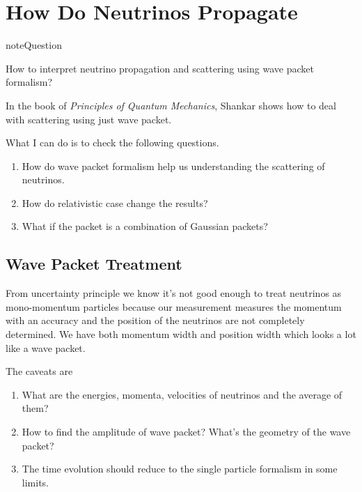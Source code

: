 \documentclass[letterpaper,12pt,english]{sphinxmanual}
\begin{document}
\chapter{How Do Neutrinos Propagate}
\label{propagation::doc}\label{propagation:how-do-neutrinos-propagate}
\begin{notice}{note}{Question}

How to interpret neutrino propagation and scattering using wave packet formalism?
\end{notice}

In the book of \emph{Principles of Quantum Mechanics}, Shankar shows how to deal with scattering using just wave packet.

What I can do is to check the following questions.
\begin{enumerate}
\item {} 
How do wave packet formalism help us understanding the scattering of neutrinos.

\item {} 
How do relativistic case change the results?

\item {} 
What if the packet is a combination of Gaussian packets?

\end{enumerate}


\section{Wave Packet Treatment}
\label{propagation:wave-packet-treatment}\label{propagation:index-0}
From uncertainty principle we know it's not good enough to treat neutrinos as mono-momentum particles because our measurement measures the momentum with an accuracy and the position of the neutrinos are not completely determined. We have both momentum width and position width which looks a lot like a wave packet.

The caveats are
\begin{enumerate}
\item {} 
What are the energies, momenta, velocities of neutrinos and the average of them?

\item {} 
How to find the amplitude of wave packet? What's the geometry of the wave packet?

\item {} 
The time evolution should reduce to the single particle formalism in some limits.

\end{enumerate}
\end{document}
